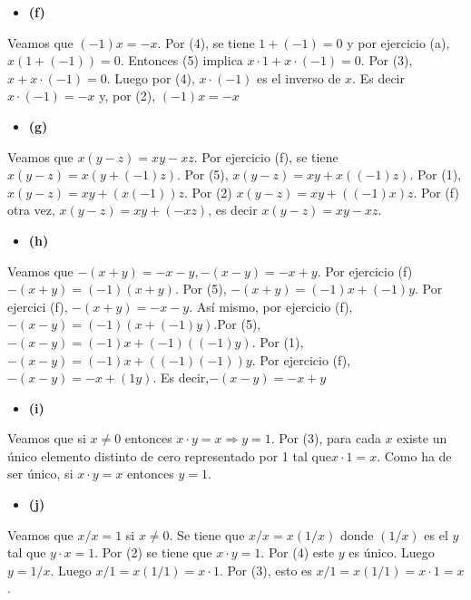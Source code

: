 \documentclass{article}
\begin{document}
\begin{itemize}
\item \bf (f) \rm 
\end{itemize}
Veamos que \(\left(-1\right)x=-x\). Por (4), se tiene \(1+\left(-1\right)=0\) y por ejercicio (a), \(x\left(1+\left(-1\right)\right)=0\). Entonces (5) implica \(x\cdot1+x\cdot\left(-1\right)=0\). Por (3), \(x+x\cdot\left(-1\right)=0\). Luego por (4), \(x\cdot\left(-1\right)\) es el inverso de \(x\). Es decir \(x\cdot\left(-1\right)=-x\) y, por (2), \(\left(-1\right)x=-x\)
\begin{itemize}
\item \bf (g) \rm 
\end{itemize}
Veamos que \(x\left(y-z\right)=xy-xz\). Por ejercicio (f), se tiene \(x\left(y-z\right)=x\left(y+\left(-1\right)z\right)\). Por (5), \(x\left(y-z\right) = xy+x \left(\left(-1\right)z\right)\).
Por (1), \(x\left(y-z\right) = xy+\left(x\left(-1\right)\right)z\). Por (2) \(x\left(y-z\right) = xy+\left(\left(-1\right)x\right)z\).
Por (f) otra vez, \(x\left(y-z\right)=xy+\left(-xz\right)\), es decir  \(x\left(y-z\right)=xy-xz\).
\begin{itemize}
\item \bf (h) \rm 
\end{itemize}
Veamos que \(-\left(x+y\right)=-x-y,-\left(x-y\right)=-x+y\). Por ejercicio (f) \(-\left(x+y\right)=\left(-1\right)\left(x+y\right)\). Por (5), \(-\left(x+y\right)=\left(-1\right)x + \left(-1\right)y \). Por ejercici (f), \(-\left(x+y\right)=-x-y\).
 Así mismo, por ejercicio (f), \(-\left(x-y\right)=\left(-1\right)\left(x+\left(-1\right)y\right)\).Por (5), \(-\left(x-y\right)=\left(-1\right)x+\left(-1\right)\left(\left(-1\right)y\right)\). Por (1), \(-\left(x-y\right) = \left(-1\right)x+\left(\left(-1\right)\left(-1\right)\right)y\). Por ejercicio (f), \(-\left(x-y\right) = -x+\left(1y\right)\). Es decir,\(-\left(x-y\right)=-x+y\)
\begin{itemize}
\item \bf (i) \rm 
\end{itemize}
Veamos que si \(x\neq0\) entonces \(x\cdot y=x\Longrightarrow y=1\).
Por (3), para cada \(x\) existe un único elemento distinto de cero representado por 1 tal que\(x\cdot 1=x\). Como ha de ser único, si \(x\cdot y=x\) entonces \(y=1\).
\begin{itemize}
\item \bf (j) \rm 
\end{itemize}
Veamos que \(x/x=1\) si \(x\neq 0\). Se tiene que \(x/x=x\left(1/x\right)\) donde \(\left(1/x\right)\) es el \(y\) tal que \(y\cdot x=1\). Por (2) se tiene que \(x\cdot y=1\). Por (4) este \(y\) es único. Luego \(y=1/x\). Luego \(x/1=x\left(1/1\right)= x\cdot 1\). Por (3), esto es \(x/1=x\left(1/1\right)= x\cdot 1=x\).
\end{document}
